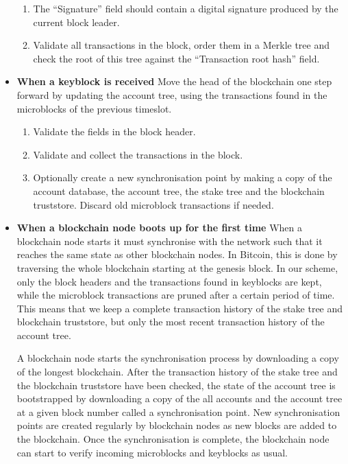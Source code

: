 \documentclass{style/kththesis}
\begin{document}
\begin{appendices}
\begin{itemize}
\begin{enumerate}
        \item The ``Signature'' field should contain a digital signature produced by the current block leader.
        \item Validate all transactions in the block, order them in a Merkle tree and check the root of this tree against the ``Transaction root hash'' field.
    \end{enumerate}
    \item \textbf{When a keyblock is received} Move the head of the blockchain one step forward by updating the account tree, using the transactions found in the microblocks of the previous timeslot.
    \begin{enumerate}
        \item Validate the fields in the block header.
        \item Validate and collect the transactions in the block.
        \item Optionally create a new synchronisation point by making a copy of the account database, the account tree, the stake tree and the blockchain truststore. Discard old microblock transactions if needed.
    \end{enumerate}
    \item \textbf{When a blockchain node boots up for the first time} When a blockchain node starts it must synchronise with the network such that it reaches the same state as other blockchain nodes. In Bitcoin, this is done by traversing the whole blockchain starting at the genesis block. In our scheme, only the block headers and the transactions found in keyblocks are kept, while the microblock transactions are pruned after a certain period of time. This means that we keep a complete transaction history of the stake tree and blockchain truststore, but only the most recent transaction history of the account tree. 
    
    A blockchain node starts the synchronisation process by downloading a copy of the longest blockchain. After the transaction history of the stake tree and the blockchain truststore have been checked, the state of the account tree is bootstrapped by downloading a copy of the all accounts and the account tree at a given block number called a synchronisation point. New synchronisation points are created regularly by blockchain nodes as new blocks are added to the blockchain. Once the synchronisation is complete, the blockchain node can start to verify incoming microblocks and keyblocks as usual.
    

\end{itemize}
\end{appendices}
\end{document}

